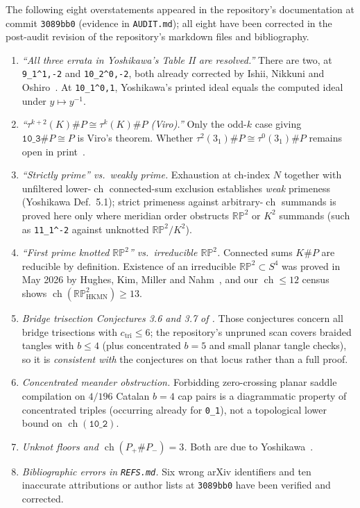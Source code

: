 \documentclass[11pt]{amsart}
\newcommand{\ch}{\operatorname{ch}}
\newcommand{\RP}{\mathbb{RP}^2}
\newcommand{\lab}[1]{\texttt{#1}}
\newcommand{\file}[1]{\texttt{#1}}
\newcommand{\inv}{^{-1}}
\theoremstyle{plain}
\theoremstyle{remark}
\begin{document}
The following eight overstatements appeared in the repository's documentation at commit \texttt{3089bb0}
(evidence in \file{AUDIT.md}); all eight have been corrected in the post-audit revision of the repository's
markdown files and bibliography.

\begin{enumerate}[leftmargin=*]
\item \emph{``All three errata in Yoshikawa's Table II are resolved.''} There are two, at
\lab{9\_1\^{}1,-2} and \lab{10\_2\^{}0,-2}, both already corrected by Ishii, Nikkuni and Oshiro~\cite{INO}.
At \lab{10\_1\^{}0,1}, Yoshikawa's printed ideal equals the computed ideal under $y\mapsto y\inv$.
\item \emph{``$\tau^{k+2}(K)\#P\cong\tau^{k}(K)\#P$ (Viro).''} Only the odd-$k$ case giving
$\lab{10\_3}\#P\cong P$ is Viro's theorem. Whether $\tau^{2}(3_1)\#P\cong\tau^{0}(3_1)\#P$ remains open in
print~\cite[Remark~3.15]{J}.
\item \emph{``Strictly prime'' vs.\ weakly prime.} Exhaustion at ch-index $N$ together with unfiltered
lower-$\ch$ connected-sum exclusion establishes \emph{weak} primeness (Yoshikawa Def.~5.1); strict primeness
against arbitrary-$\ch$ summands is proved here only where meridian order obstructs $\RP$ or $K^2$ summands
(such as \lab{11\_1\^{}-2} against unknotted $\RP/K^2$).
\item \emph{``First prime knotted $\RP$'' vs.\ irreducible $\RP$.} Connected sums $K\# P$ are reducible by
definition. Existence of an irreducible $\RP\subset S^4$ was proved in May 2026 by Hughes, Kim, Miller and
Nahm~\cite{HKMN}, and our $\ch\le 12$ census shows $\ch(\RP_{\mathrm{HKMN}})\ge 13$.
\item \emph{Bridge trisection Conjectures 3.6 and 3.7 of \cite{GLO}.} Those conjectures concern all bridge
trisections with $c_{\mathrm{tri}}\le 6$; the repository's unpruned scan covers braided tangles with
$b\le 4$ (plus concentrated $b=5$ and small planar tangle checks), so it is \emph{consistent with} the
conjectures on that locus rather than a full proof.
\item \emph{Concentrated meander obstruction.} Forbidding zero-crossing planar saddle compilation on $4/196$
Catalan $b=4$ cap pairs is a diagrammatic property of concentrated triples (occurring already for \lab{0\_1}),
not a topological lower bound on $\ch(\lab{10\_2})$.
\item \emph{Unknot floors and $\ch(P_+\#P_-)=3$.} Both are due to Yoshikawa~\cite[Remark~2.8]{Y}.
\item \emph{Bibliographic errors in \file{REFS.md}.} Six wrong arXiv identifiers and ten inaccurate
attributions or author lists at \texttt{3089bb0} have been verified and corrected.
\end{enumerate}
\end{document}
